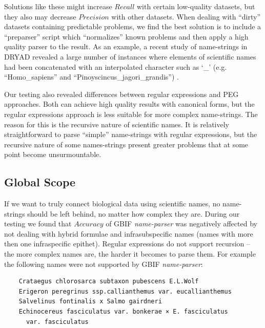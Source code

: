 \documentclass{bmcart}
\begin{document}
\vspace{0.5cm}

Solutions like these might increase $Recall$ with certain low-quality datasets,
but they also may decrease $Precision$ with other datasets. When dealing with
``dirty'' datasets containing predictable problems, we find the best solution is
to include a ``preparser'' script which ``normalizes'' known problems and then
apply a high quality parser to the result.  As an example, a recent study of
name-strings in DRYAD revealed a large number of instances where elements of
scientific names had been concatenated with an interpolated character such
as `\_’ (e.g. ``Homo\_sapiens'' and ``Pinoyscincus\_jagori\_grandis'')
\cite{Patterson:inpress-a}.

Our testing also revealed differences between regular expressions and PEG
approaches. Both can achieve high quality results with canonical forms, but the
regular expressions approach is less suitable for more complex name-strings.
The reason for this is the recursive nature of scientific names.  It is
relatively straightforward to parse ``simple'' name-strings with regular
expressions, but the recursive nature of some names-strings present greater
problems that at some point become unsurmountable.

\subsection*{Global Scope}

If we want to truly connect biological data using scientific names, no
name-strings should be left behind, no matter how complex they are. During our
testing we found that $Accuracy$ of GBIF \textit{name-parser} was negatively
affected by not dealing with hybrid formulae and infrasubspecific names (names
with more then one infraspecific epithet). Regular expressions do not support
recursion -- the more complex names are, the harder it becomes to parse them.
For example the following names were not supported by GBIF
\textit{name-parser}:

\vspace{0.5cm}

\begin{verbatim}
    Crataegus chlorosarca subtaxon pubescens E.L.Wolf
    Erigeron peregrinus ssp.callianthemus var. eucallianthemus
    Salvelinus fontinalis x Salmo gairdneri
    Echinocereus fasciculatus var. bonkerae × E. fasciculatus
      var. fasciculatus
\end{verbatim}
\end{document}
